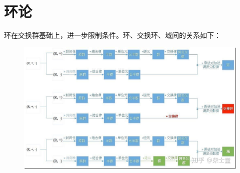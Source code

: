 \documentclass[12pt]{article}
\begin{document}
\section{环论}
环在交换群基础上，进一步限制条件。环、交换环、域间的关系如下：
\begin{figure}[H]
    \centering
    \includegraphics[width=1.0\textwidth]{fig/GroupRingField.jpg}
\end{figure}
\end{document}
